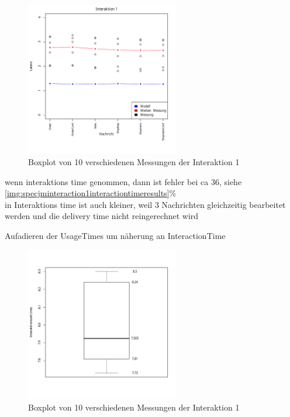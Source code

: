 \begin{figure}
\center
  \includegraphics[width=0.6\textwidth]{images/evaluation/specjmsresults/interaktion1.pdf}
  \caption{Boxplot von 10 verschiedenen Messungen der Interaktion 1}
  \label{img:specjminteraction1results}
\end{figure}


wenn interaktions time genommen, dann ist fehler bei ca 36, siehe \autoref{img:specjminteraction1interactiontimeresults}\% \\
in Interaktions time ist auch kleiner, weil 3 Nachrichten gleichzeitig bearbeitet werden und die delivery time nicht reingerechnet wird

Aufadieren der UsageTimes um näherung an InteractionTime

\begin{figure}
\center
  \includegraphics[width=0.6\textwidth]{images/evaluation/specjmsresults/interaktion1InteractionTime.pdf}
  \caption{Boxplot von 10 verschiedenen Messungen der Interaktion 1}
  \label{img:specjminteraction1interactiontimeresults}
\end{figure}

